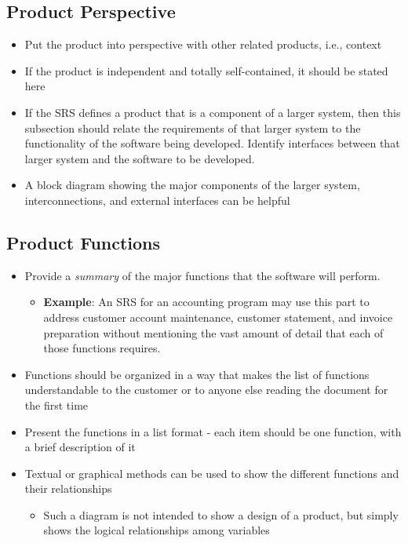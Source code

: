 \documentclass[]{article}
\begin{document}
\subsection{Product Perspective}
\label{sub:product_perspective}
\begin{itemize}
    \item Put the product into perspective with other related products, i.e., context
    \item If the product is independent and totally self-contained, it should be stated here
    \item If the SRS defines a product that is a component of a larger system, then this subsection should relate the requirements of that larger system to the functionality of the software being developed. Identify interfaces between that larger system and the software to be developed.
    \item A block diagram showing the major components of the larger system, interconnections, and external interfaces can be helpful
\end{itemize}
\subsection{Product Functions}
\label{sub:product_functions}
\begin{itemize}
    \item Provide a \emph{summary} of the major functions that the software will perform.
    \begin{itemize}
        \item \textbf{Example}: An SRS for an accounting program may use this part to address customer account maintenance, customer statement, and invoice preparation without mentioning the vast amount of detail that each of those functions requires.
    \end{itemize}
    \item Functions should be organized in a way that makes the list of functions understandable to the customer or to anyone else reading the document for the first time 
    \item Present the functions in a list format - each item should be one function, with a brief description of it
    \item Textual or graphical methods can be used to show the different functions and their relationships
    \begin{itemize}
        \item Such a diagram is not intended to show a design of a product, but simply shows the logical relationships among variables
    \end{itemize} 
\end{itemize}
\end{document}
